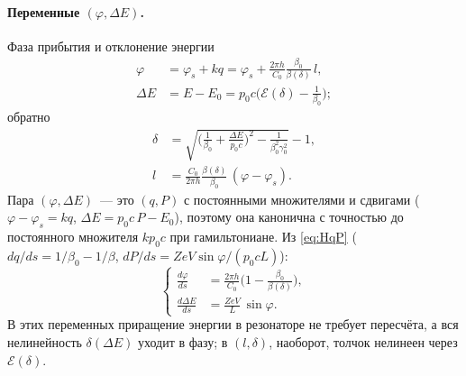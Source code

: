 \documentclass[a4paper,11pt]{article}
\numberwithin{equation}{section}
\newcommand{\cE}{\mathcal{E}}
\begin{document}
\paragraph{Переменные $(\varphi,\Delta E)$.} Фаза прибытия и отклонение энергии
\begin{equation}
\begin{aligned}
\varphi&=\varphi_s+kq=\varphi_s+\frac{2\pi h}{C_0}\frac{\beta_0}{\beta(\delta)}\,l,\\
\Delta E&=E-E_0=p_0c\Big(\cE(\delta)-\frac1{\beta_0}\Big);
\end{aligned} \label{eq:trans}
\end{equation}
обратно
\begin{equation}
\begin{aligned}
\delta&=\sqrt{\Big(\frac1{\beta_0}+\frac{\Delta E}{p_0c}\Big)^2-\frac1{\beta_0^2\gamma_0^2}}-1,\\
l&=\frac{C_0}{2\pi h}\frac{\beta(\delta)}{\beta_0}\,(\varphi-\varphi_s).
\end{aligned}
\end{equation}
Пара $(\varphi,\Delta E)$~--- это $(q,P)$ с постоянными множителями и сдвигами ($\varphi-\varphi_s=kq$,
$\Delta E=p_0c\,P-E_0$), поэтому она канонична с точностью до постоянного множителя $kp_0c$ при гамильтониане.
Из \eqref{eq:HqP} ($dq/ds=1/\beta_0-1/\beta$, $dP/ds=ZeV\sin\varphi/(p_0cL)$):
\begin{equation}
\left\{\begin{aligned}
\frac{d\varphi}{ds}&=\frac{2\pi h}{C_0}\Big(1-\frac{\beta_0}{\beta(\delta)}\Big),\\[2pt]
\frac{d\Delta E}{ds}&=\frac{ZeV}{L}\,\sin\varphi .
\end{aligned}\right. \label{eq:eomphi}
\end{equation}
В этих переменных приращение энергии в резонаторе не требует пересчёта, а вся нелинейность $\delta(\Delta E)$ уходит в фазу;
в $(l,\delta)$, наоборот, толчок нелинеен через $\cE(\delta)$.
\end{document}

